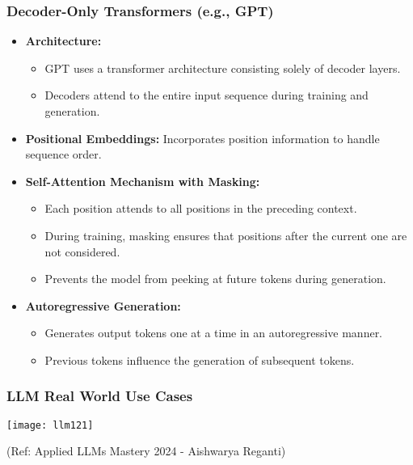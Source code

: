 \begin{frame}[fragile]\frametitle{Decoder-Only Transformers (e.g., GPT)}

  \begin{itemize}
    \item \textbf{Architecture:} 
      \begin{itemize}
        \item GPT uses a transformer architecture consisting solely of decoder layers.
        \item Decoders attend to the entire input sequence during training and generation.
      \end{itemize}

    \item \textbf{Positional Embeddings:} Incorporates position information to handle sequence order.

    \item \textbf{Self-Attention Mechanism with Masking:}
      \begin{itemize}
        \item Each position attends to all positions in the preceding context.
        \item During training, masking ensures that positions after the current one are not considered.
        \item Prevents the model from peeking at future tokens during generation.
      \end{itemize}

    \item \textbf{Autoregressive Generation:} 
      \begin{itemize}
        \item Generates output tokens one at a time in an autoregressive manner.
        \item Previous tokens influence the generation of subsequent tokens.
      \end{itemize}

  \end{itemize}

\end{frame}


\begin{frame}[fragile]\frametitle{LLM Real World Use Cases}

\begin{center}
\texttt{[image: llm121]}
\end{center}				

{\tiny (Ref: Applied LLMs Mastery 2024 - Aishwarya Reganti)}

\end{frame}

